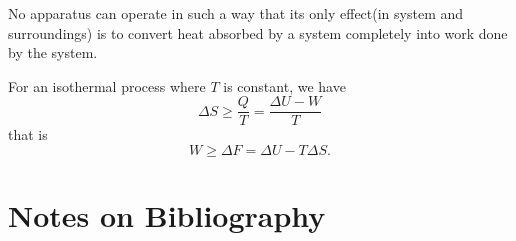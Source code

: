 \begin{theorem}\cite[159]{smith2005introduction}
No apparatus can operate in such a way that its only effect(in system and surroundings) is to convert heat absorbed by a system completely into work done by the system. 	
\end{theorem}



\begin{lemma}
	For an isothermal process where $T$ is constant, we have
	$$\Delta S \geq \frac{Q}{T} = \frac{\Delta U - W}{T}$$
	that is
	$$W \geq \Delta F = \Delta U - T\Delta S.$$
\end{lemma}




\section{Notes on Bibliography}




\printbibliography

